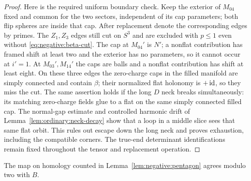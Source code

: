 \begin{proof}
Here is the required uniform boundary check.  Keep the exterior of
$M_{04}$ fixed and common for the two sectors, independent of its
cap parameters; both flip spheres are inside that cap.  After
replacement denote the corresponding edges by primes.  The
$Z_1,Z_3$ edges still cut on $S^3$ and are excluded with $p\le1$
even without \eqref{eq:negative:beta-cut}.  The cap at $M_{04}'$
is $N'$; a nonflat contribution has framed shift at least two and
the exterior has no parameters, so it cannot occur at $i'=1$.
At $M_{03}',M_{14}'$ the caps are balls and a nonflat contribution
has shift at least eight.  On these three edges the zero-charge
caps in the filled manifold are simply connected and contain $\beta$;
their normalized flat holonomy is $+\operatorname{id}$, so they miss the cut.
The same assertion holds if the long $D$ neck breaks simultaneously:
its matching zero-charge fields glue to a flat on the same simply
connected filled cap.  The normal-gap estimate and controlled
harmonic drift of Lemma~\ref{lem:ordinary:neck-decay} show that a
loop in a middle slice sees that same flat orbit.  This rules out
escape down the long neck and proves exhaustion, including the
compatible corners.  The true-end determinant identifications remain
fixed throughout the tensor and replacement operation.
\end{proof}

\begin{lemma}
\label{lem:negative:sweeps}
The map on homology counted in Lemma~\ref{lem:negative:pentagon}
agrees modulo two with $B$.
\end{lemma}

